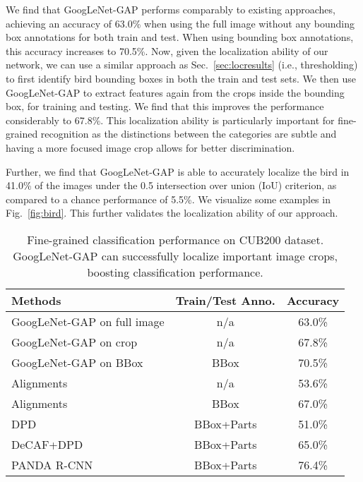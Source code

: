 \documentclass[10pt,twocolumn,letterpaper]{article}
\begin{document}
We find that GoogLeNet-GAP performs comparably to existing approaches, achieving an accuracy of 63.0\% when using the full image without any bounding box annotations for both train and test. When using bounding box annotations, this accuracy increases to 70.5\%. Now, given the localization ability of our network, we can use a similar approach as Sec.~\ref{sec:locresults} (i.e., thresholding) to first identify bird bounding boxes in both the train and test sets. We then use GoogLeNet-GAP to extract features again from the crops inside the bounding box, for training and testing. We find that this improves the performance considerably to 67.8\%. This localization ability is particularly important for fine-grained recognition as the distinctions between the categories are subtle and having a more focused image crop allows for better discrimination.

Further, we find that GoogLeNet-GAP is able to accurately localize the bird in 41.0\% of the images under the 0.5 intersection over union (IoU) criterion, as compared to a chance performance of 5.5\%. We visualize some examples in Fig.~\ref{fig:bird}. This further validates the localization ability of our approach.



\begin{table}\caption{Fine-grained classification performance on CUB200 dataset. GoogLeNet-GAP can successfully localize important image crops, boosting classification performance.}
\centering
\footnotesize
\begin{tabular}{ l | c | c }
\hline
  \hline                       
  Methods & Train/Test Anno. & Accuracy \\
    \hline  
GoogLeNet-GAP on full image & n/a & 63.0\% \\
    GoogLeNet-GAP on crop & n/a & 67.8\% \\
	GoogLeNet-GAP on BBox & BBox & 70.5\% \\
    \hline   
    Alignments \cite{gavves2014local} & n/a & 53.6\% \\
    Alignments \cite{gavves2014local} & BBox & 67.0\%\\
    DPD \cite{zhang2013deformable} & BBox+Parts & 51.0\% \\
    DeCAF+DPD \cite{donahue2014decaf} & BBox+Parts & 65.0\%\\
    PANDA R-CNN \cite{zhang2014part} & BBox+Parts & 76.4\% \\
    \hline  
\end{tabular}\label{birdresult}
\end{table}
\end{document}
